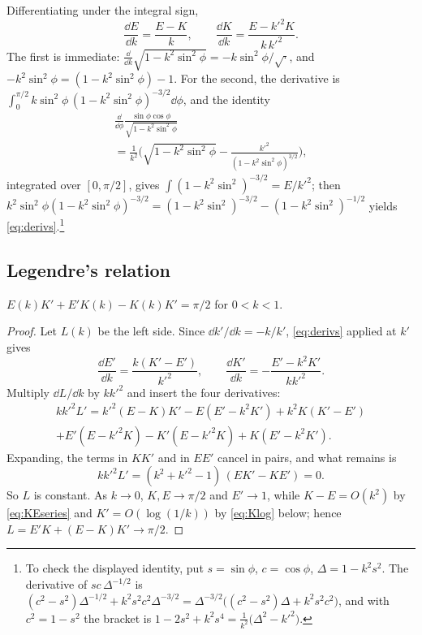 Differentiating under the integral sign,
\begin{equation}\label{eq:derivs}
\frac{\dd E}{\dd k}=\frac{E-K}k,\qquad
\frac{\dd K}{\dd k}=\frac{E-k'^2K}{k\,k'^2}.
\end{equation}
The first is immediate: $\frac{\dd}{\dd k}\sqrt{1-k^2\sin^2\phi}
=-k\sin^2\phi/\sqrt{\cdot}$, and $-k^2\sin^2\phi=(1-k^2\sin^2\phi)-1$. For the
second, the derivative is $\int_0^{\pi/2}k\sin^2\phi\,(1-k^2\sin^2\phi)^{-3/2}
\dd\phi$, and the identity
\begin{multline*}
\frac{\dd}{\dd\phi}\frac{\sin\phi\cos\phi}{\sqrt{1-k^2\sin^2\phi}}\\
=\frac1{k^2}\Big(\sqrt{1-k^2\sin^2\phi}-\frac{k'^2}{(1-k^2\sin^2\phi)^{3/2}}\Big),
\end{multline*}
integrated over $[0,\pi/2]$, gives $\int(1-k^2\sin^2)^{-3/2}=E/k'^2$; then
$k^2\sin^2\phi(1-k^2\sin^2\phi)^{-3/2}=(1-k^2\sin^2)^{-3/2}-(1-k^2\sin^2)^{-1/2}$
yields \eqref{eq:derivs}.\footnote{To check the displayed identity, put
$s=\sin\phi$, $c=\cos\phi$, $\Delta=1-k^2s^2$. The derivative of $sc\,\Delta^{-1/2}$
is $(c^2-s^2)\Delta^{-1/2}+k^2s^2c^2\Delta^{-3/2}=\Delta^{-3/2}\big((c^2-s^2)\Delta
+k^2s^2c^2\big)$, and with $c^2=1-s^2$ the bracket is
$1-2s^2+k^2s^4=\frac1{k^2}\big(\Delta^2-k'^2\big)$.}

\subsection{Legendre's relation}

\begin{lemma}\label{lem:legendre}
$E(k)K'+E'K(k)-K(k)K'=\pi/2$ for $0<k<1$.
\end{lemma}

\begin{proof}
Let $L(k)$ be the left side. Since $\dd k'/\dd k=-k/k'$, \eqref{eq:derivs}
applied at $k'$ gives
\[
\frac{\dd E'}{\dd k}=\frac{k(K'-E')}{k'^2},\qquad
\frac{\dd K'}{\dd k}=-\frac{E'-k^2K'}{kk'^2}.
\]
Multiply $\dd L/\dd k$ by $kk'^2$ and insert the four derivatives:
\begin{multline*}
kk'^2L'=k'^2(E-K)K'-E(E'-k^2K')+k^2K(K'-E')\\
+E'(E-k'^2K)-K'(E-k'^2K)+K(E'-k^2K').
\end{multline*}
Expanding, the terms in $KK'$ and in $EE'$ cancel in pairs, and what
remains is
\[
kk'^2L'=(k^2+k'^2-1)\,(EK'-KE')=0 .
\]
So $L$ is constant. As $k\to0$, $K,E\to\pi/2$ and $E'\to1$, while
$K-E=O(k^2)$ by \eqref{eq:KEseries} and $K'=O(\log(1/k))$ by
\eqref{eq:Klog} below; hence $L=E'K+(E-K)K'\to\pi/2$.
\end{proof}

